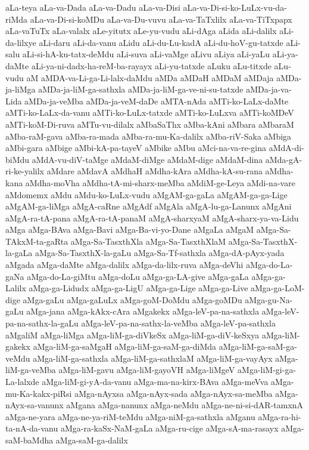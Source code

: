 {aLa-teya
aLa-va-Dada
aLa-va-Dadu
aLa-va-Disi
aLa-va-Di-si-ko-LuLx-vu-da-riMda
aLa-va-Di-si-koMDu
aLa-va-Du-vuvu
aLa-va-TaTxlilx
aLa-va-TiTxpapx
aLa-vaTuTx
aLa-valalx
aLe-yitutx
aLe-yu-vudu
aLi-dAga
aLida
aLi-dalilx
aLi-da-lilxye
aLi-daru
aLi-da-vanu
aLidu
aLi-du-Lu-kadA
aLi-du-hoV-gu-tatxde
aLi-salu
aLi-si-hA-ku-tatx-deMdu
aLi-suva
aLi-vaMge
aLivu
aLiya
aLi-yaLu
aLi-ya-daMte
aLi-ya-ni-dadx-ha-reM-ba-rayayx
aLi-yu-tatxde
aLuku
aLu-titxde
aLu-vudu
aM
aMDA-va-Li-ga-Li-lalx-daMdu
aMDa
aMDaH
aMDaM
aMDaja
aMDa-ja-liMga
aMDa-ja-liM-ga-sathxla
aMDa-ja-liM-ga-ve-ni-su-tatxde
aMDa-ja-va-Lida
aMDa-ja-veMba
aMDa-ja-veM-daDe
aMTA-nAda
aMTi-ko-LaLx-daMte
aMTi-ko-LaLx-da-vanu
aMTi-ko-LuLx-tatxde
aMTi-ko-LuLxva
aMTi-koMDeV
aMTi-koM-Di-ruva
aMTu-vu-dilalx
aMbaSaThx
aMba-kAni
aMbara
aMbaraM
aMba-raM-gava
aMba-ra-mada
aMba-ra-mu-Ka-dalilx
aMba-riV-Saka
aMbiga
aMbi-gara
aMbige
aMbi-kA-pa-tayeV
aMbike
aMbu
aMci-na-va-re-gina
aMdA-di-biMdu
aMdA-vu-diV-taMge
aMdaM-diMge
aMdaM-dige
aMdaM-dina
aMda-gA-ri-ke-yalilx
aMdare
aMdavA
aMdhaH
aMdha-kAra
aMdha-kA-su-rana
aMdha-kana
aMdha-moVha
aMdha-tA-mi-sharx-meMba
aMdiM-ge-Leya
aMdi-na-vare
aMdomemx
aMdu
aMdu-ko-LuLx-vudu
aMgAM-ga-gaLa
aMgAM-ga-ga-Lige
aMgAM-ga-liMga
aMgA-caRne
aMgAdf
aMgAla
aMgA-lu-ga-Lanunx
aMgAni
aMgA-ra-tA-pana
aMgA-ra-tA-panaM
aMgA-sharxyaM
aMgA-sharx-ya-va-Lidu
aMga
aMga-BAva
aMga-Bavi
aMga-Ba-vi-yo-Dane
aMgaLa
aMgaM
aMga-Sa-TAkxM-ta-gaRta
aMga-Sa-TasxthXla
aMga-Sa-TasxthXlaM
aMga-Sa-TasxthX-la-gaLa
aMga-Sa-TasxthX-la-gaLu
aMga-Sa-Tf-sathxla
aMga-dA-pAyx-yada
aMgada
aMga-daMte
aMga-dalilx
aMga-da-lilx-ruva
aMga-deVhi
aMga-do-La-gaNa
aMga-do-La-giMtu
aMga-doLu
aMga-ga-LA-give
aMga-gaLa
aMga-ga-Lalilx
aMga-ga-Lidudx
aMga-ga-LigU
aMga-ga-Lige
aMga-ga-Live
aMga-ga-LoM-dige
aMga-gaLu
aMga-gaLuLx
aMga-goM-DoMdu
aMga-goMDu
aMga-gu-Na-gaLu
aMga-jana
aMga-kAkx-cAra
aMgakekx
aMga-leV-pa-na-sathxla
aMga-leV-pa-na-sathx-la-gaLu
aMga-leV-pa-na-sathx-la-veMba
aMga-leV-pa-sathxla
aMgaliM
aMga-liMga
aMga-liM-ga-diVkeSx
aMga-liM-ga-diV-keSxya
aMga-liM-gakekx
aMga-liM-ga-saMgaH
aMga-liM-ga-saM-ga-diMda
aMga-liM-ga-saM-ga-veMdu
aMga-liM-ga-sathxla
aMga-liM-ga-sathxlaM
aMga-liM-ga-vayAyx
aMga-liM-ga-veMba
aMga-liM-gavu
aMga-liM-gayoVH
aMga-liMgeV
aMga-liM-gi-ga-La-lalxde
aMga-liM-gi-yA-da-vanu
aMga-ma-na-kirx-BAva
aMga-meVva
aMga-mu-Ka-kakx-piRsi
aMga-nAyxsa
aMga-nAyx-sada
aMga-nAyx-sa-meMba
aMga-nAyx-sa-vanunx
aMgana
aMga-nanunx
aMga-neMdu
aMga-ne-ni-si-dAR-tamxnA
aMga-ne-yara
aMga-ne-ya-riM-teMdu
aMga-niM-ga-sathxla
aMganu
aMga-ra-hi-ta-nA-da-vanu
aMga-ra-kaSx-NaM-gaLa
aMga-ru-cige
aMga-sA-ma-rasayx
aMga-saM-baMdha
aMga-saM-ga-dalilx
}
